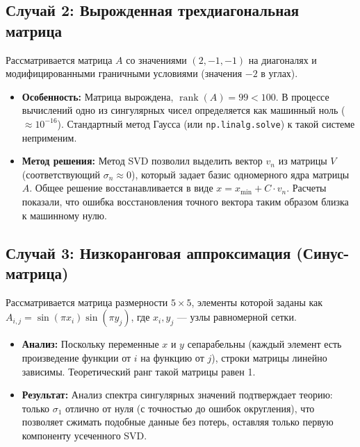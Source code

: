 \documentclass[12pt, a4paper]{article}
\theoremstyle{definition}
\begin{document}
\subsection{Случай 2: Вырожденная трехдиагональная матрица}
Рассматривается матрица $A$ со значениями $(2, -1, -1)$ на диагоналях и модифицированными граничными условиями (значения $-2$ в углах).
\begin{itemize}
    \item \textbf{Особенность:} Матрица вырождена, $\operatorname{rank}(A) = 99 < 100$. В процессе вычислений одно из сингулярных чисел определяется как машинный ноль ($\approx 10^{-16}$). Стандартный метод Гаусса (или \texttt{np.linalg.solve}) к такой системе неприменим.
    \item \textbf{Метод решения:} Метод SVD позволил выделить вектор $v_n$ из матрицы $V$ (соответствующий $\sigma_n \approx 0$), который задает базис одномерного ядра матрицы $A$. Общее решение восстанавливается в виде $x = x_{\min} + C \cdot v_n$. Расчеты показали, что ошибка восстановления точного вектора таким образом близка к машинному нулю.
\end{itemize}

\subsection{Случай 3: Низкоранговая аппроксимация (Синус-матрица)}
Рассматривается матрица размерности $5 \times 5$, элементы которой заданы как $A_{i,j} = \sin(\pi x_i) \sin(\pi y_j)$, где $x_i, y_j$ --- узлы равномерной сетки.
\begin{itemize}
    \item \textbf{Анализ:} Поскольку переменные $x$ и $y$ сепарабельны (каждый элемент есть произведение функции от $i$ на функцию от $j$), строки матрицы линейно зависимы. Теоретический ранг такой матрицы равен 1. 
    \item \textbf{Результат:} Анализ спектра сингулярных значений подтверждает теорию: только $\sigma_1$ отлично от нуля (с точностью до ошибок округления), что позволяет сжимать подобные данные без потерь, оставляя только первую компоненту усеченного SVD.
\end{itemize}
\end{document}
